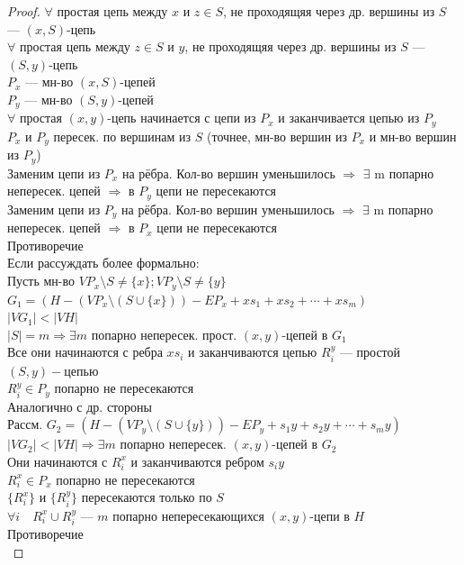 \documentclass[12pt]{article}
\begin{document}
	\begin{proof}
		$\forall$ простая цепь между $x$ и $z \in S$, не проходящяя через др. вершины из $S$ — $(x,S)$-цепь\\
		$\forall$ простая цепь между $z \in S$ и $y$, не проходящяя через др. вершины из $S$ — $(S,y)$-цепь\\
		$P_x$ — мн-во $(x,S)$-цепей\\
		$P_y$ — мн-во $(S,y)$-цепей\\
		$\forall$ простая $(x,y)$-цепь начинается с цепи из $P_x$ и заканчивается цепью из $P_y$\\
		$P_x$ и $P_y$ пересек. по вершинам из $S$ (точнее, мн-во вершин из $P_x$ и мн-во вершин из $P_y$)\\
		Заменим цепи из $P_x$ на рёбра. Кол-во вершин уменьшилось $\Rightarrow$ $\exists$ m попарно непересек. цепей $\Rightarrow$ в $P_y$ цепи не пересекаются\\
		Заменим цепи из $P_y$ на рёбра. Кол-во вершин уменьшилось $\Rightarrow$ $\exists$ m попарно непересек. цепей $\Rightarrow$ в $P_x$ цепи не пересекаются\\
		Противоречие\\
		Если рассуждать более формально:\\
		Пусть мн-во $VP_x \setminus S \neq \{x\}; VP_y \setminus S \neq \{y\}$\\
		$G_1 = (H - (VP_x \setminus (S \cup \{x\})) - EP_x+ xs_1 + xs_2 + \dotsb + xs_m)$\\
		$|VG_1| < |VH|$\\
		$|S| = m \Rightarrow \exists m$ попарно непересек. прост. $(x,y)$-цепей в $G_1$\\
		Все они начинаются с ребра $xs_i$ и заканчиваются цепью $R_i^y$ — простой $(S,y)-цепью$\\
		$R_i^y \in P_y$ попарно не пересекаются\\
		Аналогично с др. стороны\\
		Рассм. $G_2 = (H - (VP_y \setminus (S \cup \{y\})) - EP_y+ s_1y + s_2y + \dotsb + s_my)$\\
		$|VG_2| < |VH| \Rightarrow \exists m$ попарно непересек. $(x,y)$-цепей в $G_2$\\
		Они начинаются с $R_i^x$ и заканчиваются ребром $s_iy$\\
		$R_i^x \in P_x$ попарно не пересекаются\\
		$\{R_i^x\}$ и $\{R_i^y\}$ пересекаются только по $S$\\
		$\forall i \quad R_i^x \cup R_i^y$ — $m$ попарно непересекающихся $(x,y)$-цепи в $H$\\
		Противоречие\\		
	\end{proof}
\end{document}
